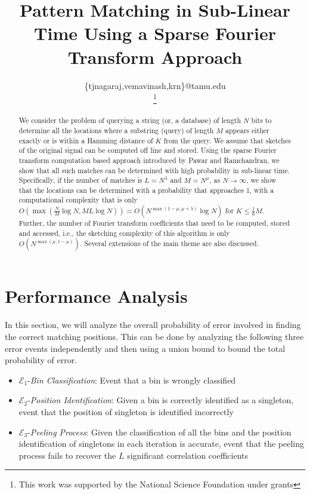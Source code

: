 \documentclass[journal,11pt,onecolumn]{IEEEtran}  %
\title{\LARGE \bf
Pattern Matching in Sub-Linear Time Using a Sparse Fourier Transform Approach
}
\author{\IEEEauthorblockN{Nagaraj T. Janakiraman, Avinash Vem, Krishna R. Narayanan \\}
\IEEEauthorblockA{Department of Electrical \& Comp. Engg., Texas A\&M University, College Station, TX, U.S.A\\}
\{tjnagaraj,vemavinash,krn\}@tamu.edu\\
\thanks{This work was supported by the National Science Foundation under grants}
}
\begin{document}
\maketitle
\thispagestyle{empty}
\pagestyle{empty}

\begin{abstract}
We consider the problem of querying a string (or, a database) of length $N$ bits to determine all the locations where a substring (query) of length $M$ appears either exactly or is within a Hamming distance of $K$ from the query. We assume that sketches of the original signal can be computed off line and stored. Using the sparse Fourier transform computation based approach introduced by Pawar and Ramchandran, we show that all such matches can be determined with high probability in sub-linear time. Specifically, if the number of matches is $L=N^\lambda$ and $M = N^\mu$, as $N \rightarrow \infty$, we show that the locations can be determined with a probability that approaches 1, with a computational complexity that is only $O\left(\max \left(\frac{N}{M} \log N, M L \log N \right) \right) = O\left(N^{\max(1-\mu,\mu+\lambda)} \log N \right)$ for $K \leq \frac{1}{6}M$. Further, the number of Fourier transform coefficients that need to be computed, stored and accessed, i.e., the sketching complexity of this algorithm is only $O\left( N^{\max(\mu,1-\mu)}\right)$. Several extensions of the main theme are also discussed.
\end{abstract}


  
%
\section{Performance Analysis}
\def\vgap{2pt}
In this section, we will analyze the overall probability of error involved in finding the correct matching positions. This can be done by analyzing the following three error events independently and then using a union bound to bound the total probability of error.

\begin{itemize}
	\item $\mathcal{E}_1${-\it Bin Classification}: Event that a bin is wrongly classified
	\item $\mathcal{E}_2${-\it Position Identification}: Given a bin is correctly identified as a singleton, event that the position of singleton is identified incorrectly
	\item $\mathcal{E}_3${-\it Peeling Process}: Given the classification of all the bins and the position identification of singletons in each iteration is accurate, event that the peeling process fails to recover the $L$ significant correlation coefficients
\end{itemize}
\end{document}
